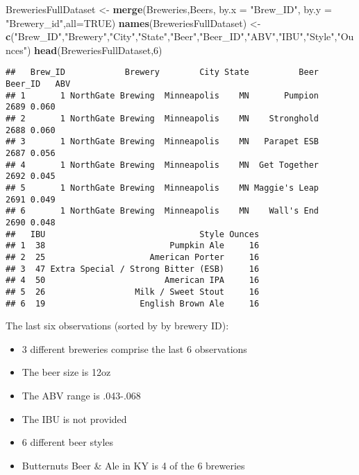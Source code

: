 \documentclass[]{article}
\newenvironment{Shaded}{\begin{snugshade}}{\end{snugshade}}
\newcommand{\DataTypeTok}[1]{\textcolor[rgb]{0.13,0.29,0.53}{#1}}
\newcommand{\DecValTok}[1]{\textcolor[rgb]{0.00,0.00,0.81}{#1}}
\newcommand{\KeywordTok}[1]{\textcolor[rgb]{0.13,0.29,0.53}{\textbf{#1}}}
\newcommand{\NormalTok}[1]{#1}
\newcommand{\OtherTok}[1]{\textcolor[rgb]{0.56,0.35,0.01}{#1}}
\newcommand{\StringTok}[1]{\textcolor[rgb]{0.31,0.60,0.02}{#1}}
\providecommand{\tightlist}{%
  \setlength{\itemsep}{0pt}\setlength{\parskip}{0pt}}
\begin{document}
\begin{Shaded}
\begin{Highlighting}[]
\NormalTok{BreweriesFullDataset <-}\StringTok{ }\KeywordTok{merge}\NormalTok{(Breweries,Beers, }\DataTypeTok{by.x =} \StringTok{"Brew_ID"}\NormalTok{, }\DataTypeTok{by.y =} \StringTok{"Brewery_id"}\NormalTok{,}\DataTypeTok{all=}\OtherTok{TRUE}\NormalTok{)}
\KeywordTok{names}\NormalTok{(BreweriesFullDataset) <-}\StringTok{ }\KeywordTok{c}\NormalTok{(}\StringTok{"Brew_ID"}\NormalTok{,}\StringTok{"Brewery"}\NormalTok{,}\StringTok{"City"}\NormalTok{,}\StringTok{"State"}\NormalTok{,}\StringTok{"Beer"}\NormalTok{,}\StringTok{"Beer_ID"}\NormalTok{,}\StringTok{"ABV"}\NormalTok{,}\StringTok{"IBU"}\NormalTok{,}\StringTok{"Style"}\NormalTok{,}\StringTok{"Ounces"}\NormalTok{)}
\KeywordTok{head}\NormalTok{(BreweriesFullDataset,}\DecValTok{6}\NormalTok{)}
\end{Highlighting}
\end{Shaded}

\begin{verbatim}
##   Brew_ID            Brewery        City State          Beer Beer_ID   ABV
## 1       1 NorthGate Brewing  Minneapolis    MN       Pumpion    2689 0.060
## 2       1 NorthGate Brewing  Minneapolis    MN    Stronghold    2688 0.060
## 3       1 NorthGate Brewing  Minneapolis    MN   Parapet ESB    2687 0.056
## 4       1 NorthGate Brewing  Minneapolis    MN  Get Together    2692 0.045
## 5       1 NorthGate Brewing  Minneapolis    MN Maggie's Leap    2691 0.049
## 6       1 NorthGate Brewing  Minneapolis    MN    Wall's End    2690 0.048
##   IBU                               Style Ounces
## 1  38                         Pumpkin Ale     16
## 2  25                     American Porter     16
## 3  47 Extra Special / Strong Bitter (ESB)     16
## 4  50                        American IPA     16
## 5  26                  Milk / Sweet Stout     16
## 6  19                   English Brown Ale     16
\end{verbatim}

The last six observations (sorted by by brewery ID):

\begin{itemize}
\tightlist
\item
  3 different breweries comprise the last 6 observations
\item
  The beer size is 12oz
\item
  The ABV range is .043-.068
\item
  The IBU is not provided
\item
  6 different beer styles
\item
  Butternuts Beer \& Ale in KY is 4 of the 6 breweries
\end{itemize}
\end{document}
